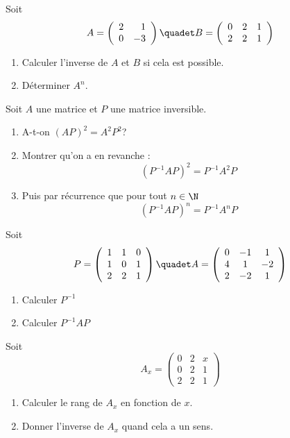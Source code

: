 \documentclass[a4paper, 11pt,reqno]{article}
\begin{document}
\begin{exercice}
Soit $$A=\left(\begin{array}{rr} 2&1\\0&-3 \end{array}\right) \quadet B=\left(\begin{array}{rrr} 0&2&1\\2&2&1 \end{array}\right)$$
\begin{enumerate}
\item Calculer l'inverse de $A$ et $B$ si cela est possible. 
\item Déterminer $A^n$.
\end{enumerate}
\end{exercice}


\begin{exercice}
Soit $A$ une matrice et $P$ une matrice inversible. 
\begin{enumerate}
\item A-t-on $(AP)^2 =A^2 P^2 $?
\item Montrer qu'on a en revanche : 
$$(P^{-1}A P )^2 =P^{-1} A^2 P$$
\item Puis par récurrence  que  pour tout $n\in \N$
$$(P^{-1}A P )^n =P^{-1} A^n P$$
\end{enumerate}


\end{exercice}

\begin{exercice}

 Soit $$P= \left(
\begin{array}{ccc}
1&1&0\\
1&0&1\\
2&2&1
\end{array}
 \right) \quadet A=\left(
\begin{array}{ccc}
0&-1&1\\
4&1&-2\\
2&-2&1
\end{array}
 \right)$$

\begin{enumerate}
\item  Calculer $P^{-1}$
\item Calculer $P^{-1}AP$
\end{enumerate}
\end{exercice}

\begin{exercice}
Soit $$ A_x=\left(\begin{array}{rrr}  0&2&x\\0&2&1\\2&2&1 \end{array}\right)$$
\begin{enumerate}
\item Calculer le rang de $A_x$ en fonction de $x$.
\item Donner l'inverse de $A_x$ quand cela a un sens.
\end{enumerate}
\end{exercice}
\end{document}
